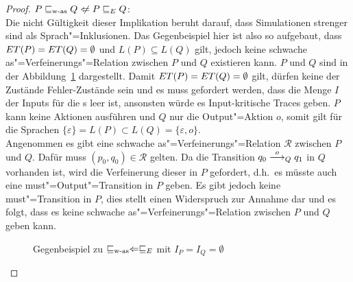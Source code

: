 \begin{proof}
  $P\wasRel Q\hspace{0.1cm}\not\hspace{-0.1cm}\Leftarrow P\ERel Q$:\\
  Die nicht Gültigkeit dieser Implikation beruht darauf, dass Simulationen
  strenger sind als Sprach"=Inklusionen. Das Gegenbeispiel hier ist also so
  aufgebaut, dass $ET (P) =ET (Q) = \emptyset$ und $L(P) \subseteq L(Q)$
  gilt, jedoch keine schwache as"=Verfeinerungs"=Relation zwischen $P$ und $Q$
  existieren kann. $P$ und $Q$ sind in der Abbildung~\ref{WasEGegenBsp}
  dargestellt. Damit $ET (P) =ET (Q) = \emptyset$ gilt, dürfen keine der
  Zustände Fehler-Zustände sein und es muss gefordert werden, dass die Menge
  $I$ der Inputs für die \MEIO{}s leer ist, ansonsten würde es Input-kritische
  Traces geben. $P$ kann keine Aktionen ausführen und $Q$ nur die
  Output"=Aktion $o$, somit gilt für die Sprachen $\{\varepsilon\} = L(P)
  \subset L(Q) = \{\varepsilon , o\}$.\\
  Angenommen es gibt eine schwache as"=Verfeinerungs"=Relation $\mathcal{R}$
  zwischen $P$ und $Q$. Dafür muss $(p_0,q_0)\in \mathcal{R}$ gelten. Da die
  Transition $q_0 \must[o]_Q q_1$ in $Q$ vorhanden ist, wird die Verfeinerung
  dieser in $P$ gefordert, d.h.\ es müsste auch eine must"=Output"=Transition
  in $P$ geben. Es gibt jedoch keine must"=Transition in $P$, dies stellt einen
  Widerspruch zur Annahme dar und es folgt, dass es keine schwache
  as"=Verfeinerungs"=Relation zwischen $P$ und $Q$ geben kann.

  \begin{figure}[htbp]
    \begin{center}
      \caption{Gegenbeispiel zu $\sqsubseteq _{\mathrm{w}\text{-}\mathrm{as}} \Leftarrow  \sqsubseteq  _E$ mit $I_P = I_Q =
      \emptyset$}
      \label{WasEGegenBsp}
    \end{center}
  \end{figure}
  \enlargethispage{\baselineskip}
\end{proof}

